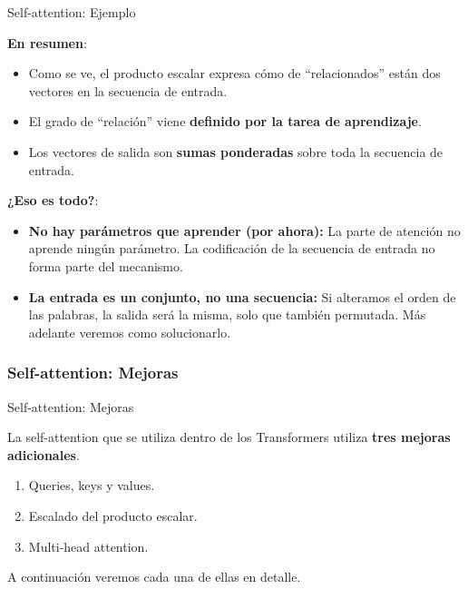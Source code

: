 \documentclass[aspectratio=169]{beamer}
\begin{document}
\begin{frame}{Self-attention: Ejemplo}

  \textbf{En resumen}:\\
  \begin{itemize}
    \item Como se ve, el producto escalar expresa cómo de ``relacionados'' están dos vectores en la secuencia de entrada.
    \item El grado de ``relación'' viene \textbf{definido por la tarea de aprendizaje}.
    \item Los vectores de salida son \textbf{sumas ponderadas} sobre toda la secuencia de entrada.
  \end{itemize}
  \vspace{.3cm}

  \textbf{¿Eso es todo?}:\\
  \begin{itemize}
    \item \textbf{No hay parámetros que aprender (por ahora):} La parte de atención no aprende ningún parámetro. La codificación de la secuencia de entrada no forma parte del mecanismo.
    \item \textbf{La entrada es un conjunto, no una secuencia:} Si alteramos el orden de las palabras, la salida será la misma, solo que también permutada. Más adelante veremos como solucionarlo.
  \end{itemize}

\end{frame}

\subsubsection{Self-attention: Mejoras}

\begin{frame}{Self-attention: Mejoras}

  \begin{block}{}
    La self-attention que se utiliza dentro de los Transformers utiliza \textbf{tres mejoras adicionales}.
  \end{block}
  \vspace{.3cm}
  \begin{enumerate}
    \item Queries, keys y values.
    \item Escalado del producto escalar.
    \item Multi-head attention.
  \end{enumerate}
  \vspace{.3cm}
  A continuación veremos cada una de ellas en detalle.

\end{frame}
\end{document}
